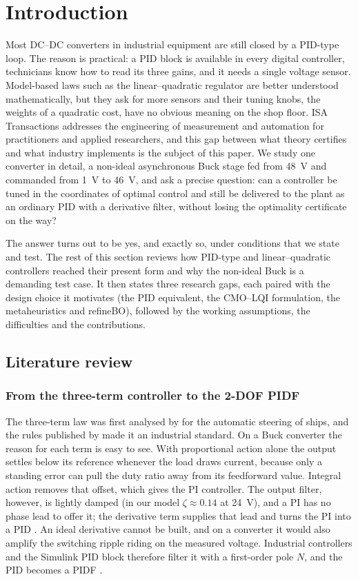 \section{Introduction}\label{sec:intro}

Most DC--DC converters in industrial equipment are still closed by a PID-type
loop. The reason is practical: a PID block is available in every digital
controller, technicians know how to read its three gains, and it needs a single
voltage sensor. Model-based laws such as the linear--quadratic regulator are
better understood mathematically, but they ask for more sensors and their
tuning knobs, the weights of a quadratic cost, have no obvious meaning on the
shop floor. ISA Transactions addresses the engineering of measurement and
automation for practitioners and applied researchers, and this gap between
what theory certifies and what industry implements is the subject of this
paper. We study one converter in detail, a non-ideal asynchronous Buck stage fed
from \SI{48}{V} and commanded from \SI{1}{V} to \SI{46}{V}, and ask a precise
question: can a controller be tuned in the coordinates of optimal control and
still be delivered to the plant as an ordinary PID with a derivative filter,
without losing the optimality certificate on the way?

The answer turns out to be yes, and exactly so, under conditions that we state
and test. The rest of this section reviews how PID-type and linear--quadratic
controllers reached their present form and why the non-ideal Buck is a
demanding test case. It then states three research gaps, each paired with the
design choice it motivates (the PID equivalent, the CMO--LQI formulation, the
metaheuristics and refineBO), followed by the working assumptions, the
difficulties and the contributions.

\subsection{Literature review}\label{sec:lit}

\subsubsection{From the three-term controller to the 2-DOF PIDF}
The three-term law was first analysed by \citet{Minorsky1922} for the automatic
steering of ships, and the rules published by \citet{Ziegler1942} made it an
industrial standard. On a Buck converter the reason for each term is easy to
see. With proportional action alone the output settles below its reference
whenever the load draws current, because only a standing error can pull the
duty ratio away from its feedforward value. Integral action removes that
offset, which gives the PI controller. The output filter, however, is lightly
damped (in our model $\zeta\approx0.14$ at \SI{24}{V}), and a PI has no phase
lead to offer it; the derivative term supplies that lead and turns the PI into
a PID \citep{Astrom2006}. An ideal derivative cannot be built, and on a
converter it would also amplify the switching ripple riding on the measured
voltage. Industrial controllers and the Simulink PID block therefore filter it
with a first-order pole $N$, and the PID becomes a PIDF
\citep{Ang2005,Astrom2006}.

